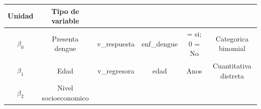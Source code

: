 \documentclass[
]{article}
\begin{document}
\begin{longtable}[]{@{}cccccc@{}}
\begin{minipage}[b]{0.15\columnwidth}
Unidad\strut
\end{minipage} & \begin{minipage}[b]{0.13\columnwidth}\centering
Tipo de variable\strut
\end{minipage}\tabularnewline
\midrule
\endhead
\begin{minipage}[t]{0.07\columnwidth}\centering
\(\beta_0\)\strut
\end{minipage} & \begin{minipage}[t]{0.13\columnwidth}\centering
Presenta dengue\strut
\end{minipage} & \begin{minipage}[t]{0.17\columnwidth}\centering
v\_respuesta\strut
\end{minipage} & \begin{minipage}[t]{0.18\columnwidth}\centering
enf\_dengue\strut
\end{minipage} & \begin{minipage}[t]{0.15\columnwidth}\centering
1 = si; 0 = No\strut
\end{minipage} & \begin{minipage}[t]{0.13\columnwidth}\centering
Categorica binomial\strut
\end{minipage}\tabularnewline
\begin{minipage}[t]{0.07\columnwidth}\centering
\(\beta_1\)\strut
\end{minipage} & \begin{minipage}[t]{0.13\columnwidth}\centering
Edad\strut
\end{minipage} & \begin{minipage}[t]{0.17\columnwidth}\centering
v\_regresora\strut
\end{minipage} & \begin{minipage}[t]{0.18\columnwidth}\centering
edad\strut
\end{minipage} & \begin{minipage}[t]{0.15\columnwidth}\centering
Anos\strut
\end{minipage} & \begin{minipage}[t]{0.13\columnwidth}\centering
Cuantitativa distreta\strut
\end{minipage}\tabularnewline
\begin{minipage}[t]{0.07\columnwidth}\centering
\(\beta_2\)\strut
\end{minipage} & \begin{minipage}[t]{0.13\columnwidth}\centering
Nivel socioeconomico\strut
\end{minipage} & \begin{minipage}[t]{0.17\columnwidth}\centering

\end{minipage}
\end{longtable}
\end{document}
